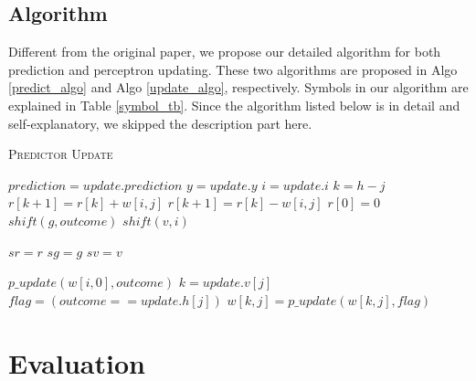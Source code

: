 \documentclass[conference]{IEEEtran}
\begin{document}
\subsection{Algorithm}
Different from the original paper, we propose our detailed algorithm for both prediction and perceptron updating. These two algorithms are proposed in Algo \ref{predict_algo} and Algo \ref{update_algo}, respectively. Symbols in our algorithm are explained in Table \ref{symbol_tb}. Since the algorithm listed below is in detail and self-explanatory, we skipped the description part here.


\begin{algorithm}[!htp]
  \caption{\textsc{Predictor Update}}
  \label{update_algo}
  \begin{algorithmic}
	\State $prediction=update.prediction$
	\State $y=update.y$
	\State $i=update.i$
		\State $k=h-j$
			\State $r[k+1]=r[k]+w[i, j]$
		\Else
			\State $r[k+1]=r[k]-w[i, j]$
		\EndIf
	\EndFor
	\State $r[0]=0$
	\State $shift(g, outcome)$
	\State $shift(v, i)$

		\State $sr=r$
		\State $sg=g$
		\State $sv=v$
	\EndIf

		\State $p\_update(w[i, 0], outcome)$
			\State $k=update.v[j]$
			\State $flag=(outcome==update.h[j])$
			\State $w[k, j]=p\_update(w[k, j], flag)$
		\EndFor
	\EndIf
  \EndFunction
  \end{algorithmic}
\end{algorithm}


\section{Evaluation}
\end{document}
